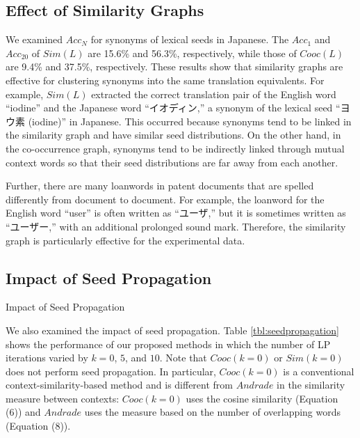 \documentclass[english]{jnlp_1.4}
\begin{document}
\subsection{Effect of Similarity Graphs}
\label{sect:comp_proposed}

We examined $\mathit{Acc}_{N}$ for synonyms of lexical seeds in Japanese. 
The $\mathit{Acc}_{1}$ and $\mathit{Acc}_{20}$ of $\mathit{Sim}(L)$ are 15.6\% and 56.3\%, respectively, while those of $\mathit{Cooc}(L)$ are 9.4\% and 37.5\%, respectively. 
These results show that similarity graphs are effective for clustering synonyms into the same translation equivalents. 
For example, $\mathit{Sim}(L)$ extracted the correct translation pair of the English word ``iodine'' and the Japanese word ``イオディン,'' a synonym of the lexical seed ``ヨウ素 (iodine)'' in Japanese. 
This occurred because synonyms tend to be linked in the similarity graph and have similar seed distributions. 
On the other hand, in the co-occurrence graph, synonyms tend to be indirectly linked through mutual context words so that their seed distributions are far away from each another. 

Further, there are many loanwords in patent documents that are spelled differently from document to document. 
For example, the loanword for the English word ``user'' is often written as ``ユーザ,'' but it is sometimes written as ``ユーザー,'' with an additional prolonged sound mark. 
Therefore, the similarity graph is particularly effective for the experimental data. 


\subsection{Impact of Seed Propagation}
\label{sect:seedpropagation}

\begin{table}[b]
\caption{Impact of Seed Propagation}
\label{tbl:seedpropagation}

\end{table}

We also examined the impact of seed propagation. 
Table \ref{tbl:seedpropagation} shows the performance of our proposed methods in which the number of LP iterations varied by $k=0$, $5$, and $10$. 
Note that $\mathit{Cooc}(k=0)$ or $\mathit{Sim}(k=0)$ does not perform seed propagation. 
In particular, $\mathit{Cooc}(k=0)$ is a conventional context-similarity-based method 
 and is different from $\mathit{Andrade}$ in the similarity measure between contexts: $\mathit{Cooc}(k=0)$ uses the cosine similarity (Equation (6)) and $\mathit{Andrade}$ uses the measure based on the number of overlapping words (Equation (8)). 
\end{document}
